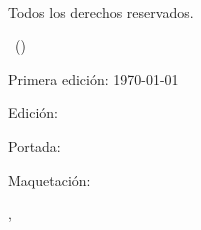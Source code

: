 
\thispagestyle{empty}

\vspace*{\fill}
\small
\textbf{\mytitle}\par
\medskip
\textcopyright~\the\year\ \mypublishingcompany \par
Todos los derechos reservados. \par
\medskip

\ifxetex
  \edicionordinal\ (\the\year)\par
\else
  Primera edición: \today\par
\fi

\medskip
Edición: \textit{\editorName}\par
Portada: \textit{\designerName}\par
\ifx
	\typesetterName\empty
\else
	Maquetación: \textit{\typesetterName}\par
\fi

\medskip
\mypublishingcompany, \mypublishingcompanylocation \par
\vspace*{\fill}

\clearpage
